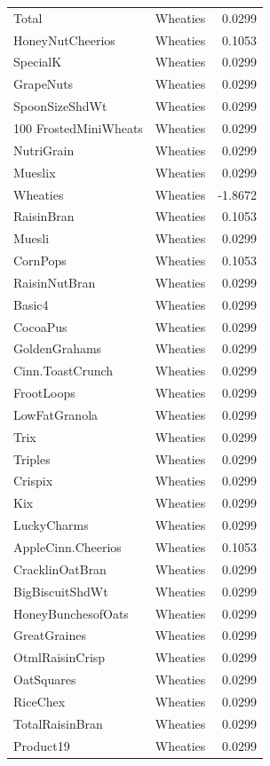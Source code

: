 \begin{longtable}{llr}
Total & Wheaties & 0.0299 \\
HoneyNutCheerios & Wheaties & 0.1053 \\
SpecialK & Wheaties & 0.0299 \\
GrapeNuts & Wheaties & 0.0299 \\
SpoonSizeShdWt & Wheaties & 0.0299 \\
100%
FrostedMiniWheats & Wheaties & 0.0299 \\
NutriGrain & Wheaties & 0.0299 \\
Mueslix & Wheaties & 0.0299 \\
Wheaties & Wheaties & -1.8672 \\
RaisinBran & Wheaties & 0.1053 \\
Muesli & Wheaties & 0.0299 \\
CornPops & Wheaties & 0.1053 \\
RaisinNutBran & Wheaties & 0.0299 \\
Basic4 & Wheaties & 0.0299 \\
CocoaPus & Wheaties & 0.0299 \\
GoldenGrahams & Wheaties & 0.0299 \\
Cinn.ToastCrunch & Wheaties & 0.0299 \\
FrootLoops & Wheaties & 0.0299 \\
LowFatGranola & Wheaties & 0.0299 \\
Trix & Wheaties & 0.0299 \\
Triples & Wheaties & 0.0299 \\
Crispix & Wheaties & 0.0299 \\
Kix & Wheaties & 0.0299 \\
LuckyCharms & Wheaties & 0.0299 \\
AppleCinn.Cheerios & Wheaties & 0.1053 \\
CracklinOatBran & Wheaties & 0.0299 \\
BigBiscuitShdWt & Wheaties & 0.0299 \\
HoneyBunchesofOats & Wheaties & 0.0299 \\
GreatGraines & Wheaties & 0.0299 \\
OtmlRaisinCrisp & Wheaties & 0.0299 \\
OatSquares & Wheaties & 0.0299 \\
RiceChex & Wheaties & 0.0299 \\
TotalRaisinBran & Wheaties & 0.0299 \\
Product19 & Wheaties & 0.0299 \\

\end{longtable}
